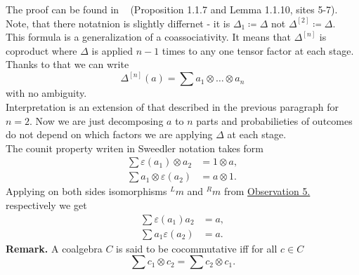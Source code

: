 \documentclass[a4paper, 12pt]{report}
\begin{document}
The proof can be found in ~\cite{DNR} (Proposition 1.1.7 and Lemma 1.1.10, sites 5-7). Note, that there
notatnion is slightly differnet - it is $\Delta_1 \coloneqq \Delta$ not $\Delta^{[2]} \coloneqq \Delta$. \\
This formula is a generalization of a coassociativity. It means that $\Delta^{[n]}$ is coproduct where
$\Delta$ is applied $n-1$ times to any one tensor factor at each stage. Thanks to that we can write
\begin{equation*}
\Delta^{[n]}(a) = \sum a_1 \otimes \dots \otimes a_n
\end{equation*}
with no ambiguity. \\
Interpretation is an extension of that described in the previous paragraph for $n = 2$. Now we are just
decomposing $a$ to $n$ parts and probabilieties of outcomes do not depend on which factors we are
applying $\Delta$ at each stage.  \\[8pt]
The counit property writen in Sweedler notation takes form
\begin{align*}
\sum\varepsilon(a_1) \otimes a_2 &= 1 \otimes a, \\
\sum a_1 \otimes \varepsilon(a_2) &= a \otimes 1.
\end{align*}
Applying on both sides isomorphisms ${^Lm}$ and ${^Rm}$ from
\hyperref[observation:5]{Observation 5.} respectively we get
\begin{align*}
\sum\varepsilon(a_1)a_2 &= a, \\
\sum a_1\varepsilon(a_2) &= a.
\end{align*}
\textbf{Remark. } A coalgebra $C$ is said to be cocommutative iff for all $c \in C$
\begin{equation*}
\sum c_1 \otimes c_2 = \sum c_2 \otimes c_1.
\end{equation*}
\end{document}
